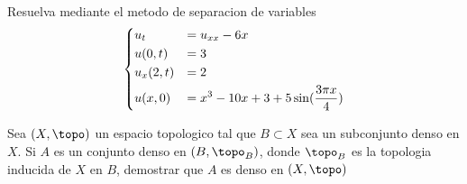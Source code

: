 \documentclass{article}
\begin{document}
\begin{problem}
  Resuelva mediante el metodo de separacion de variables
  \begin{equation*}
  \begin{dcases}
    u_t &= u_{xx} - 6x\\
    u(0, t) &= 3\\
    u_{x}(2, t) &= 2\\
    u(x, 0) &= x^{3} - 10x + 3 + 5 \sin(\frac{3\pi x}{4})
  \end{dcases}
  \end{equation*}
\end{problem}

\begin{problem}
  Sea $(X, \topo)$ un espacio topologico tal que $B \subset X$ sea un subconjunto denso en $X$. Si
  $A$ es un conjunto denso en $(B, \topo_{B})$, donde $\topo_{B}$ es la topologia inducida de $X$ en $B$, demostrar que $A$ es denso en $(X, \topo)$
\end{problem}
\end{document}
